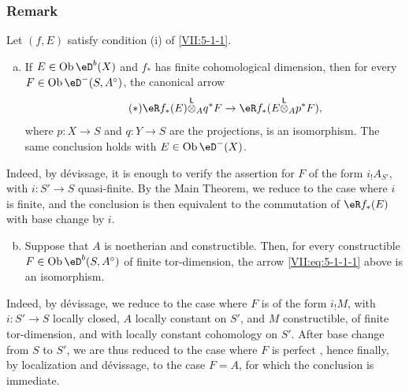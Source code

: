 \subsubsection{Remark}\label{VII:5-1-2}

Let $(f,E)$ satisfy condition (i) of \ref{VII:5-1-1}.
\begin{enumerate}[a)]
  \item If $E\in \ob \eD^b(X)$ and $f_\ast$ has finite cohomological
    dimension, then for every $F\in \ob\eD^-(S,A^\circ)$, the canonical arrow
    \begin{equation*}\tag{$*$}\label{VII:eq:5-1-1-1}
      \eR f_\ast(E)\lotimes_A q^\ast F \to \eR f_\ast(E\lotimes_A p^\ast F) \text{,} 
    \end{equation*}
    where $p:X\to S$ and $q:Y\to S$ are the projections, is an isomorphism.
    The same conclusion holds with $E\in\ob\eD^-(X)$.
\end{enumerate} 

Indeed, by dévissage, it is enough to verify the assertion for $F$ of the
form $i_! A_{S'}$, with $i:S'\to S$ quasi-finite. By the Main Theorem, we
reduce to the case where $i$ is finite, and the conclusion is then equivalent
to the commutation of $\eR f_\ast(E)$ with base change by $i$.
\begin{enumerate}[a)]
\setcounter{enumi}{1}
  \item Suppose that $A$ is noetherian and constructible. Then, for every
    constructible $F\in\ob\eD^b(S,A^\circ)$ of finite tor-dimension, the arrow
    \eqref{VII:eq:5-1-1-1} above is an isomorphism.
\end{enumerate}

Indeed, by dévissage, we reduce to the case where $F$ is of the form $i_! M$,
with $i:S'\to S$ locally closed, $A$ locally constant on $S'$, and $M$
constructible, of finite tor-dimension, and with locally constant cohomology
on $S'$. After base change from $S$ to $S'$, we are thus reduced to the case
where $F$ is perfect \cite[I]{sga6}, hence finally, by localization and
dévissage, to the case $F=A$, for which the conclusion is immediate.





\subsubsection{}\label{VII:5-1-3}

